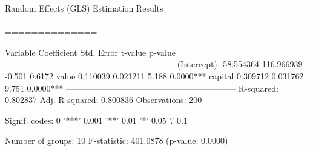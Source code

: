 
Random Effects (GLS) Estimation Results
============================================================

Variable         Coefficient   Std. Error    t-value    p-value
------------------------------------------------------------
(Intercept)       -58.554364   116.966939     -0.501     0.6172
value               0.110039     0.021211      5.188     0.0000***
capital             0.309712     0.031762      9.751     0.0000***
------------------------------------------------------------
R-squared: 0.802837
Adj. R-squared: 0.800836
Observations: 200

Signif. codes: 0 '***' 0.001 '**' 0.01 '*' 0.05 '.' 0.1


Number of groups: 10
F-statistic: 401.0878 (p-value: 0.0000)
